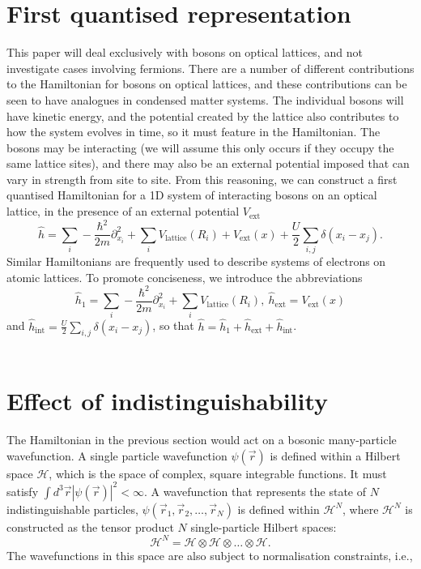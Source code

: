 \documentclass[a4paper,10pt]{article}
\begin{document}
\section{First quantised representation}
This paper will deal exclusively with bosons on optical lattices, and not investigate cases involving fermions.
There are a number of different contributions to the Hamiltonian for bosons on optical lattices, and these contributions can be seen to have analogues in condensed matter systems.
The individual bosons will have kinetic energy, and the potential created by the lattice also contributes to how the system evolves in time, so it must feature in the Hamiltonian.
The bosons may be interacting (we will assume this only occurs if they occupy the same lattice sites), and there may also be an external potential imposed that can vary in strength
from site to site. From this reasoning, we can construct a first quantised Hamiltonian for a 1D system of interacting bosons on an optical lattice, in the presence of an external potential $V_{\text{ext}}$
\begin{equation}
  \label{eq:HamiltonianCoordinateRepresentation}
 \hat{h}=\sum_{i}-\frac{\hbar^{2}}{2m}  \partial_{x_{i}}^2+\sum_{i}V_{\text{lattice}}(R_{i})+V_{\text{ext}}(x)+\frac{U}{2}\sum_{i,j}\delta(x_{i}-x_{j}).
\end{equation}
Similar Hamiltonians are frequently used to describe systems of electrons on atomic lattices. To promote conciseness, we introduce the abbreviations 
\begin{equation}
 \hat{h}_1=\sum_{i}-\frac{\hbar^{2}}{2m}  \partial_{x_{i}}^2+\sum_{i}V_{\text{lattice}}(R_{i}), \ \hat{h}_{\text{ext}} =V_{\text{ext}}(x) 
\end{equation}
and $\hat{h}_{\text{int}}=\frac{U}{2}\sum_{i,j}\delta(x_{i}-x_{j})$, so that $\hat{h}=\hat{h}_1+\hat{h}_{\text{ext}}+\hat{h}_{\text{int}}$.
\\\\

\section{Effect of indistinguishability}
The Hamiltonian in the previous section would act on a bosonic many-particle wavefunction. A single particle wavefunction $\psi(\vec{r})$ is 
defined within a Hilbert space $\mathcal{H}$, which is the space of complex, square integrable functions. It must satisfy $\int d^3\vec{r}|\psi(\vec{r})|^2<\infty$.
A wavefunction that represents the state of $N$ indistinguishable particles, $\psi(\vec{r}_{1},\vec{r}_{2},\dots,\vec{r}_{N})$ is defined within $\mathcal{H}^N$, where
$\mathcal{H}^N$ is constructed as the tensor product $N$ single-particle Hilbert spaces:
\begin{equation}
 \mathcal{H}^N=\mathcal{H}\otimes \mathcal{H} \otimes \dots\otimes \mathcal{H}.
\end{equation}
The wavefunctions in this space are also subject to normalisation constraints, i.e.,
\end{document}
